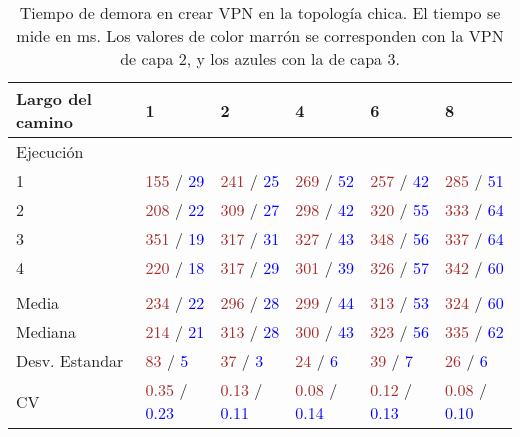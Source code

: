\begin{table}[!h]
	\caption{Tiempo de demora en crear VPN en la topología chica. El tiempo se mide en ms. Los valores de color marrón se corresponden con la VPN de capa 2, y los azules con la de capa 3.}
	\centering 
	\begin{tabular}{p{3.2cm} p{1.8cm} p{1.8cm} p{1.8cm} p{1.8cm} p{1.8cm}}
		\hline
		Largo del camino & 1 & 2 & 4 & 6 & 8 \\ [0.5ex]
		\hline
		Ejecución & & & & & \\
		1 & \textcolor{brown}{155} / \textcolor{blue}{29} & \textcolor{brown}{241} / \textcolor{blue}{25} & \textcolor{brown}{269} / \textcolor{blue}{52} & \textcolor{brown}{257} / \textcolor{blue}{42} & \textcolor{brown}{285} / \textcolor{blue}{51} \\
		2 & \textcolor{brown}{208} / \textcolor{blue}{22} & \textcolor{brown}{309} / \textcolor{blue}{27} & \textcolor{brown}{298} / \textcolor{blue}{42} & \textcolor{brown}{320} / \textcolor{blue}{55} & \textcolor{brown}{333} / \textcolor{blue}{64}  \\
		3 & \textcolor{brown}{351} / \textcolor{blue}{19} & \textcolor{brown}{317} / \textcolor{blue}{31} & \textcolor{brown}{327} / \textcolor{blue}{43} & \textcolor{brown}{348} / \textcolor{blue}{56} & \textcolor{brown}{337} / \textcolor{blue}{64}  \\
		4 & \textcolor{brown}{220} / \textcolor{blue}{18} & \textcolor{brown}{317} / \textcolor{blue}{29} & \textcolor{brown}{301} / \textcolor{blue}{39} & \textcolor{brown}{326} / \textcolor{blue}{57} & \textcolor{brown}{342} / \textcolor{blue}{60}  \\
		& & & & & \\
		Media & \textcolor{brown}{234} / \textcolor{blue}{22} & \textcolor{brown}{296} / \textcolor{blue}{28} & \textcolor{brown}{299} / \textcolor{blue}{44} & \textcolor{brown}{313} / \textcolor{blue}{53} & \textcolor{brown}{324} / \textcolor{blue}{60} \\
		Mediana & \textcolor{brown}{214} / \textcolor{blue}{21} & \textcolor{brown}{313} / \textcolor{blue}{28} & \textcolor{brown}{300} / \textcolor{blue}{43} & \textcolor{brown}{323} / \textcolor{blue}{56} & \textcolor{brown}{335} / \textcolor{blue}{62} \\
		Desv. Estandar & \textcolor{brown}{83} / \textcolor{blue}{5} & \textcolor{brown}{37} / \textcolor{blue}{3} & \textcolor{brown}{24} / \textcolor{blue}{6} & \textcolor{brown}{39} / \textcolor{blue}{7} & \textcolor{brown}{26} / \textcolor{blue}{6} \\
		CV & \textcolor{brown}{0.35} / \textcolor{blue}{0.23} & \textcolor{brown}{0.13} / \textcolor{blue}{0.11} & \textcolor{brown}{0.08} / \textcolor{blue}{0.14} & \textcolor{brown}{0.12} / \textcolor{blue}{0.13} & \textcolor{brown}{0.08} / \textcolor{blue}{0.10} \\ [1ex]
		\hline
	\end{tabular}
	\label{table:tiempo_topo_chica}
\end{table}

